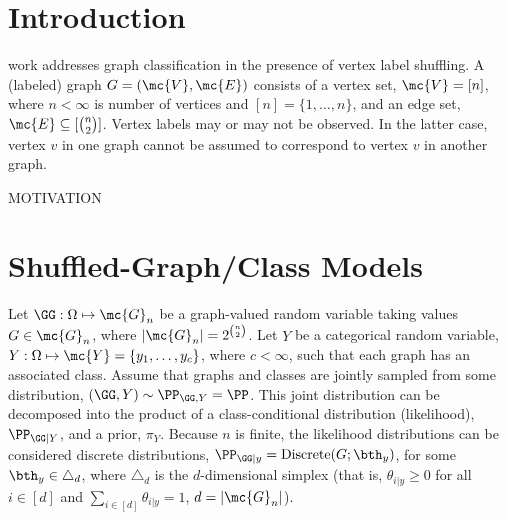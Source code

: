 \documentclass[10pt,journal,cspaper,compsoc]{IEEEtran}
\begin{document}
\maketitle
\IEEEdisplaynotcompsoctitleabstractindextext
\IEEEpeerreviewmaketitle



\section{Introduction}

 work addresses graph classification in the presence of vertex label shuffling.   
A (labeled) graph $G=(\mc{V},\mc{E})$ consists of a vertex set, $\mc{V}=[n]$, where $n < \infty$ is number of vertices and $[n]=\{1,\ldots, n\}$, and an edge set, $\mc{E} \subseteq [\binom{n}{2}]$.  Vertex labels may or may not be observed.  In the latter case, vertex $v$ in one graph cannot be assumed to correspond to vertex $v$ in another graph.

MOTIVATION




\section{Shuffled-Graph/Class Models} %
\label{sec:shuffler_graph_class_models}


 Let $\GG: \Omega \mapsto \mc{G}_n$ be a graph-valued random variable taking values $G\in \mc{G}_n$, where $|\mc{G}_n|=2^{\binom{n}{2}}$. 
Let $Y$ be a categorical random variable, $Y: \Omega \mapsto \mc{Y}=\{y_1,\ldots, y_{c}\}$, where $c< \infty$, such that each graph has an associated class.  Assume that graphs and classes are jointly sampled from some distribution, $(\GG,Y) \sim \PP_{\GG,Y}=\PP$.  This joint distribution can be decomposed into the product of a class-conditional distribution (likelihood), $\PP_{\GG|Y}$, and a prior, $\pi_Y$. Because $n$ is finite, the likelihood distributions can be considered discrete distributions, $\PP_{\GG | y}=\text{Discrete}(G; \bth_y)$, for some $\bth_y \in \triangle_d$, where $\triangle_d$ is the $d$-dimensional simplex (that is, $\theta_{i|y}\geq 0$ for all $i \in [d]$ and $\sum_{i \in [d]} \theta_{i|y}=1$, $d=|\mc{G}_n|$). 
\end{document}
